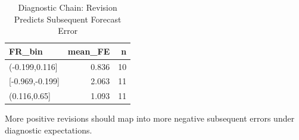 \begin{table}[!htbp]
\centering
\caption{Diagnostic Chain: Revision Predicts Subsequent Forecast Error}
\label{tab:revision_predicts_error}
\begin{threeparttable}

\begin{tabular}{lrr}
\toprule
FR\_bin & mean\_FE & n\\
\midrule
(-0.199,0.116] & 0.836 & 10\\
{}[-0.969,-0.199] & 2.063 & 11\\
(0.116,0.65] & 1.093 & 11\\
\bottomrule
\end{tabular}
\begin{tablenotes}[flushleft]
\footnotesize
\item More positive revisions should map into more negative subsequent errors under diagnostic expectations.
\end{tablenotes}
\end{threeparttable}
\end{table}
